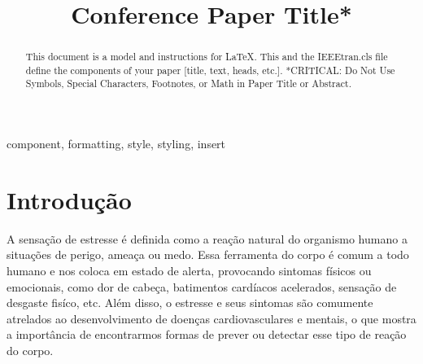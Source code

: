 \documentclass[conference]{IEEEtran}
\begin{document}
\newcommand{\thead}[1]{\begin{tabular}{@{}c@{}}#1\end{tabular}}

\title{Conference Paper Title*\\
}

\author{
\and
{}
\and
{}
\and
{}
}

\maketitle

\begin{abstract}
This document is a model and instructions for \LaTeX.
This and the IEEEtran.cls file define the components of your paper [title, text, heads, etc.]. *CRITICAL: Do Not Use Symbols, Special Characters, Footnotes, 
or Math in Paper Title or Abstract.
\end{abstract}

\begin{IEEEkeywords}
component, formatting, style, styling, insert
\end{IEEEkeywords}

\section{Introdução}
A sensação de estresse é definida como a reação natural do organismo humano a situações de perigo, ameaça ou medo. Essa ferramenta
do corpo é comum a todo humano e nos coloca em estado de alerta, provocando sintomas físicos ou emocionais, como dor de cabeça,
batimentos cardíacos acelerados, sensação de desgaste fisíco, etc. Além disso, o estresse e seus sintomas são comumente atrelados ao desenvolvimento de
doenças cardiovasculares e mentais, o que mostra a importância de encontrarmos formas de prever ou detectar esse tipo de reação
do corpo. 
\end{document}
